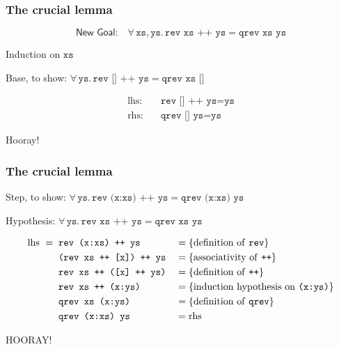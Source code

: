 \documentclass[serif,professionalfont]{beamer}
\newcommand\fa[1]{ \forall \, #1 . \,}
\newcommand\faa[2]{ \forall \, #1 , #2 . \,}
\newcommand\dn[0]{\vspace{\baselineskip}}
\newcommand\hs[1]{\texttt{#1}}
\newcommand\xs[0]{\hs{xs}}
\newcommand\ys[0]{\hs{ys}}
\begin{document}
\begin{frame}[fragile]
  \frametitle{The crucial lemma}

  \begin{equation*}
  \textsf{New Goal:} \quad \faa{\xs}{\ys} \hs{rev xs ++ ys} = \hs{qrev xs ys}
  \end{equation*}


  \vspace{\baselineskip}

  Induction on $\xs$

  \dn \pause

  Base, to show: $\fa{\ys} \hs{rev [] ++ ys} = \hs{qrev xs []}$

  \begin{align*}
    \text{lhs:} \quad & \hs{rev [] ++ ys} = \ys  \\
    \text{rhs:} \quad & \hs{qrev [] ys} = \ys
  \end{align*}

   \pause

  {\begin{center}{\color{MyGreen} Hooray!}\end{center}}
\end{frame}

\begin{frame}[fragile]
  \frametitle{The crucial lemma}
  Step, to show: $\fa{\ys} \hs{rev (x:xs) ++ ys} = \hs{qrev (x:xs) ys}$

  \dn

  Hypothesis: $\fa{\ys} \hs{rev xs ++ ys} = \hs{qrev xs ys}$

  \pause

  \begin{align*}
  \text{lhs } = \;\; & \hs{rev (x:xs) ++ ys}      && =\{\text{definition of \hs{rev}}\} \\
                     & \hs{(rev xs ++ [x]) ++ ys} && =\{\text{associativity of \hs{++}}\} \\
                     & \hs{rev xs ++ ([x] ++ ys)} && =\{\text{definition of \hs{++}}\} \\
                     & \hs{rev xs ++ (x:ys)}      && =\{\text{induction hypothesis on $\hs{(x:ys)}$}\} \\
                     & \hs{qrev xs (x:ys)}        && =\{\text{definition of \hs{qrev}}\} \\
                     & \hs{qrev (x:xs) ys}        && = \text{rhs}
  \end{align*}

  \pause
  {\begin{center}{\color{MyGreen} \Large HOORAY!}\end{center}}

\end{frame}
\end{document}
